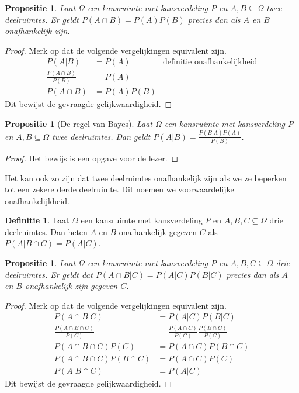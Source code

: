 \documentclass[a4paper]{book}
\newtheorem{proposition}[theorem]{Propositie}
\theoremstyle{definition}
\newtheorem{definition}[theorem]{Definitie}
\begin{document}
\begin{proposition}
    Laat $\Omega$ een kansruimte met kansverdeling $P$ en $A,B \subseteq \Omega$ twee deelruimtes.
    Er geldt $P(A \cap B) = P(A)P(B)$ precies dan als $A$ en $B$ onafhankelijk zijn.
\end{proposition}
\begin{proof}
    Merk op dat de volgende vergelijkingen equivalent zijn.
    \begin{align*}
        P(A|B)                      &= P(A) & \text{definitie onafhankelijkheid}\\
        \frac{P(A \cap B)}{P(B)}    &= P(A) \\
        P(A \cap B)                 &= P(A)P(B)
    \end{align*}
    Dit bewijst de gevraagde gelijkwaardigheid.
\end{proof}

\begin{proposition}[De regel van Bayes]\label{bayes}
    Laat $\Omega$ een kansruimte met kansverdeling $P$ en $A,B \subseteq \Omega$ twee deelruimtes.
    Dan geldt $P(A|B) = \frac{P(B|A)P(A)}{P(B)}$.
\end{proposition}
\begin{proof}
    Het bewijs is een opgave voor de lezer.
\end{proof}

Het kan ook zo zijn dat twee deelruimtes onafhankelijk zijn als we ze beperken tot een zekere derde deelruimte.
Dit noemen we voorwaardelijke onafhankelijkheid.
\begin{definition}
    Laat $\Omega$ een kansruimte met kansverdeling $P$ en $A,B,C \subseteq \Omega$ drie deelruimtes.
    Dan heten $A$ en $B$ onafhankelijk gegeven $C$ als $P(A|B \cap C) = P(A|C)$.
\end{definition}

\begin{proposition}
    Laat $\Omega$ een kansruimte met kansverdeling $P$ en $A,B,C \subseteq \Omega$ drie deelruimtes.
    Er geldt dat $P(A \cap B|C) = P(A|C)P(B|C)$ precies dan als $A$ en $B$ onafhankelijk zijn gegeven $C$.
\end{proposition}
\begin{proof}
    Merk op dat de volgende vergelijkingen equivalent zijn.
    \begin{align*}
        P(A \cap B|C)                       &= P(A|C)P(B|C) \\
        \frac{P(A \cap B \cap C)}{P(C)}     &= \frac{P(A \cap C)}{P(C)} \frac{P(B \cap C)}{P(C)} \\
        P(A \cap B \cap C)P(C)              &= P(A \cap C)P(B \cap C) \\
        P(A \cap B \cap C)P(B \cap C)       &= P(A \cap C)P(C) \\
        P(A | B \cap C)                     &= P(A | C)
    \end{align*}
    Dit bewijst de gevraagde gelijkwaardigheid.
\end{proof}
\end{document}
